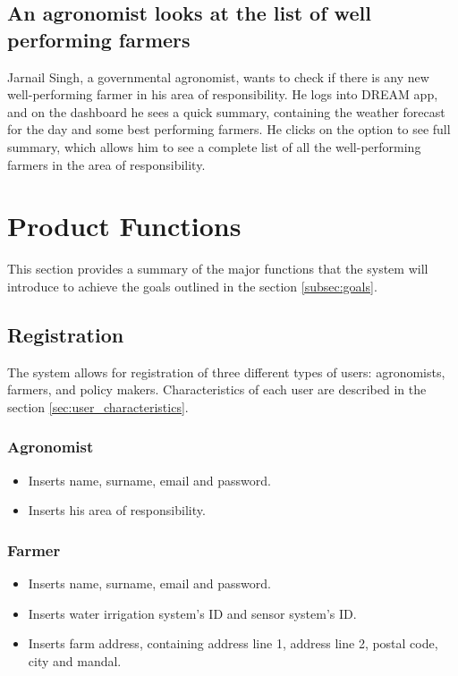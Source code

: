 \subsection*{An agronomist looks at the list of well performing farmers}
Jarnail Singh, a governmental agronomist, wants to check if there is any new well-performing farmer in his area of responsibility. He logs into DREAM app, and on the dashboard he sees a quick summary, containing the weather forecast for the day and some best performing farmers. He clicks on the option to see full summary, which allows him to see a complete list of all the well-performing farmers in the area of responsibility. 

\section{Product Functions}

This section provides a summary of the major functions that the system will introduce to achieve the goals outlined in the section \ref{subsec:goals}.

\subsection{Registration}
The system allows for registration of three different types of users: agronomists, farmers, and policy makers. Characteristics of each user are described in the section \ref{sec:user_characteristics}.

\subsubsection*{Agronomist}

\begin{itemize}
    \item Inserts name, surname, email and password.
    \item Inserts his area of responsibility.
\end{itemize}

\subsubsection*{Farmer}

\begin{itemize}
    \item Inserts name, surname, email and password.
    \item Inserts water irrigation system’s ID and sensor system's ID.
    \item Inserts farm address, containing address line 1, address line 2, postal code, city and mandal.
\end{itemize}

